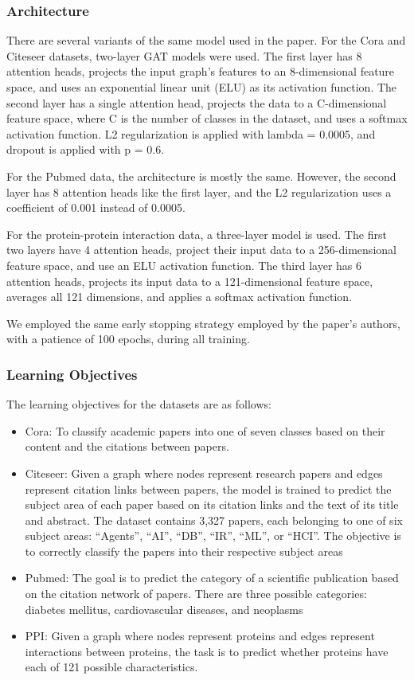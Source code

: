 \subsubsection{Architecture}
There are several variants of the same model used in the paper.
For the Cora and Citeseer datasets, two-layer GAT models were used. The first
layer has 8 attention heads, projects the input graph's features to an
8-dimensional feature space, and uses an exponential linear unit (ELU) as its
activation function. The second layer has a single attention head, projects
the data to a C-dimensional feature space, where C is the number of classes in
the dataset, and uses a softmax activation function.  L2 regularization is
applied with lambda = 0.0005, and dropout is applied with p = 0.6.

For the Pubmed data, the architecture is mostly the same. However, the second
layer has 8 attention heads like the first layer, and the L2 regularization
uses a coefficient of 0.001 instead of 0.0005.

For the protein-protein interaction data, a three-layer model is used. The
first two layers have 4 attention heads, project their input data to a
256-dimensional feature space, and use an ELU activation function. The third
layer has 6 attention heads, projects its input data to a 121-dimensional
feature space, averages all 121 dimensions, and applies a softmax activation
function.

We employed the same early stopping strategy employed by the paper's authors,
with a patience of 100 epochs, during all training.

\subsubsection{Learning Objectives}
The learning objectives for the datasets are as follows:
\begin{itemize}
    \item Cora: To classify academic papers into one of seven classes based on their content and the citations between papers.
    \item Citeseer: Given a graph where nodes represent research papers and edges represent citation links between
    papers, the model is trained to predict the subject area of each paper based on its citation links and the text
    of its title and abstract.
    The dataset contains 3,327 papers, each belonging to one of six subject areas:
    ``Agents'', ``AI'', ``DB'', ``IR'', ``ML'', or ``HCI''.
    The objective is to correctly classify the papers into their respective subject areas
    \item Pubmed: The goal is to predict the category of a scientific publication based on the citation network of papers.
    There are three possible categories: diabetes mellitus, cardiovascular diseases, and neoplasms
    \item PPI: Given a graph where nodes represent proteins and edges represent interactions between proteins,
    the task is to predict whether proteins have each of 121 possible characteristics.
\end{itemize}
